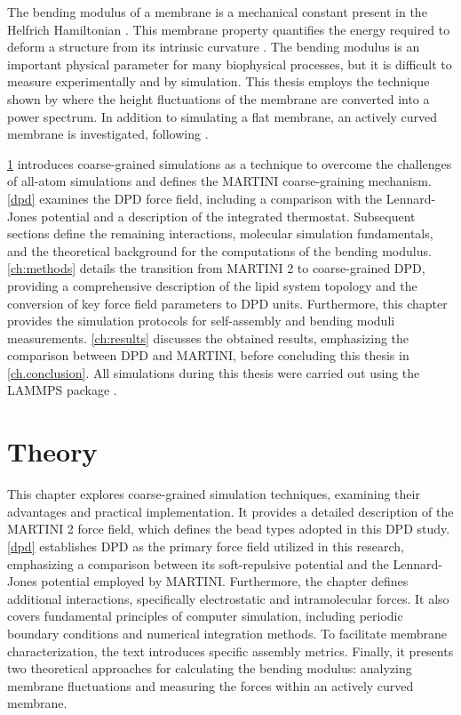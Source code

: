 \documentclass[
    11pt,
    a4paper,
    oneside,        %
    BCOR=10mm,      %
    parskip=half,   %
    listof=nototoc,   %
    bibliography=totoc %
]{scrreprt}
\begin{document}
The bending modulus of a membrane is a mechanical constant present in the Helfrich Hamiltonian \cite{Helfrich_paper}. This membrane property quantifies the energy required to deform a structure from its intrinsic curvature \cite{bending_mod_puzzling_pic}. The bending modulus is an important physical parameter for many biophysical processes, but it is difficult to measure experimentally and by simulation. This thesis employs the technique shown by \citeauthor{Cooke_bending_mod} \cite{Cooke_bending_mod} where the height fluctuations of the membrane are converted into a power spectrum. In addition to simulating a flat membrane, an actively curved membrane is investigated, following \citeauthor{Markus_tethers} \cite{Markus_tethers}. 

\cref{ch:theory} introduces coarse-grained simulations as a technique to overcome the challenges of all-atom simulations and defines the MARTINI coarse-graining mechanism. \cref{dpd} examines the DPD force field, including a comparison with the Lennard-Jones potential and a description of the integrated thermostat. Subsequent sections define the remaining interactions, molecular simulation fundamentals, and the theoretical background for the computations of the bending modulus. \cref{ch:methods} details the transition from MARTINI 2 to coarse-grained DPD, providing a comprehensive description of the lipid system topology and the conversion of key force field parameters to DPD units. Furthermore, this chapter provides the simulation protocols for self-assembly and bending moduli measurements. \cref{ch:results} discusses the obtained results, emphasizing the comparison between DPD and MARTINI, before concluding this thesis in \cref{ch.conclusion}.
All simulations during this thesis were carried out using the LAMMPS package \cite{LAMMPS}.

\chapter{Theory}\label{ch:theory}

This chapter explores coarse-grained simulation techniques, examining their advantages and practical implementation. It provides a detailed description of the MARTINI 2 force field, which defines the bead types adopted in this DPD study. \cref{dpd} establishes DPD as the primary force field utilized in this research, emphasizing a comparison between its soft-repulsive potential and the Lennard-Jones potential employed by MARTINI. Furthermore, the chapter defines additional interactions, specifically electrostatic and intramolecular forces. It also covers fundamental principles of computer simulation, including periodic boundary conditions and numerical integration methods. To facilitate membrane characterization, the text introduces specific assembly metrics. Finally, it presents two theoretical approaches for calculating the bending modulus: analyzing membrane fluctuations and measuring the forces within an actively curved membrane.
\end{document}
